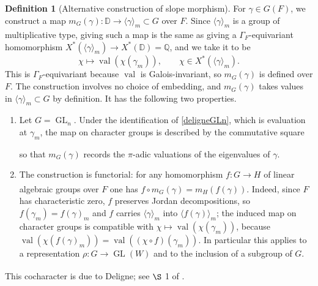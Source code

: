\documentclass[11pt,a4paper]{article}
\theoremstyle{definition}
\newtheorem{D}[shared]{Definition}
\theoremstyle{plain}
\theoremstyle{remark}
\theoremstyle{plain}
\DeclareMathOperator{\GL}{GL}
\DeclareMathOperator{\val}{val}
\begin{document}
\begin{D}[Alternative construction of slope morphism]\label{delignecocharacter}
    For $\gamma \in G(F)$, we construct a map $m_G(\gamma): \mathbb{D} \xrightarrow[]{} \langle \gamma \rangle_m \subset G$ over $F$. Since $\langle \gamma \rangle_m$ is a group of multiplicative type, giving such a map is the same as giving a $\Gamma_F$-equivariant homomorphism $X^*(\langle \gamma \rangle_m) \xrightarrow[]{} X^*(\mathbb{D}) = \mathbb{Q}$, and we take it to be
    $$\chi \mapsto \val(\chi(\gamma_m)), \qquad \chi \in X^*(\langle \gamma \rangle_m).$$
    This is $\Gamma_F$-equivariant because $\val$ is Galois-invariant, so $m_G(\gamma)$ is defined over $F$. The construction involves no choice of embedding, and $m_G(\gamma)$ takes values in $\langle \gamma \rangle_m \subset G$ by definition. It has the following two properties.
    \begin{enumerate}
        \item Let $G = \GL_n$. Under the identification of \ref{deligneGLn}, which is evaluation at $\gamma_m$, the map on character groups is described by the commutative square
        \begin{center}
        \end{center}
        so that $m_G(\gamma)$ records the $\pi$-adic valuations of the eigenvalues of $\gamma$.
        \item The construction is functorial: for any homomorphism $f: G \xrightarrow[]{} H$ of linear algebraic groups over $F$ one has $f \circ m_G(\gamma) = m_H(f(\gamma))$. Indeed, since $F$ has characteristic zero, $f$ preserves Jordan decompositions, so $f(\gamma_m) = f(\gamma)_m$ and $f$ carries $\langle \gamma \rangle_m$ into $\langle f(\gamma) \rangle_m$; the induced map on character groups is compatible with $\chi \mapsto \val(\chi(\gamma_m))$, because $\val(\chi(f(\gamma)_m)) = \val((\chi \circ f)(\gamma_m))$. In particular this applies to a representation $\rho: G \xrightarrow[]{} \GL(W)$ and to the inclusion of a subgroup of $G$.
    \end{enumerate}
    This cocharacter is due to Deligne; see $\S$ 1 of \cite{MR425033}.
\end{D}
\end{document}
